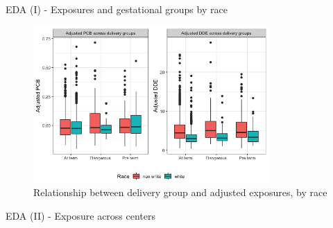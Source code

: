 \documentclass{beamer}\usepackage[]{graphicx}\usepackage[]{color}
\begin{document}
\begin{frame}{EDA (I) - Exposures and gestational groups by race}

\begin{figure}
  \centering
  \includegraphics[width=0.8\textwidth]{Fig1-Adjusted_exposure_gestgroup.png}
\caption{Relationship between delivery group and adjusted exposures, by race}
\label{fig:p1}
\end{figure}
\end{frame}

\begin{frame}{EDA (II) - Exposure across centers}
\end{frame}
\end{document}
